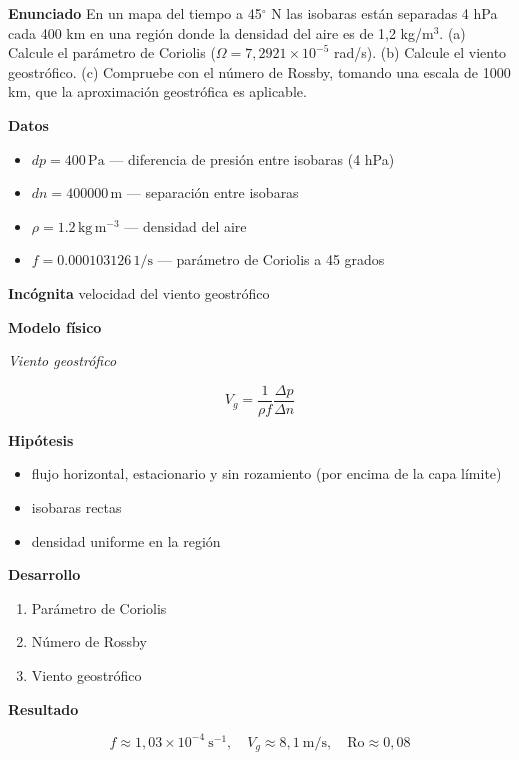\documentclass[10pt,openany]{book}
\begin{document}
\begin{tcolorbox}[title={Problema resuelto}, studiumworked, breakable]

\noindent\textbf{Enunciado}
En un mapa del tiempo a 45\(^\circ\) N las isobaras están separadas 4 hPa cada 400 km en una región donde la densidad del aire es de 1,2 kg/m\(^3\). (a) Calcule el parámetro de Coriolis (\(\Omega = 7{,}2921\times 10^{-5}\) rad/s). (b) Calcule el viento geostrófico. (c) Compruebe con el número de Rossby, tomando una escala de 1000 km, que la aproximación geostrófica es aplicable.

\noindent\textbf{Datos}
\begin{itemize}
\item $dp = 400\,\mathrm{Pa}$ — diferencia de presión entre isobaras (4 hPa)
\item $dn = 400000\,\mathrm{m}$ — separación entre isobaras
\item $\rho = 1.2\,\mathrm{kg}\,\mathrm{m}^{-3}$ — densidad del aire
\item $f = 0.000103126\,\mathrm{1/s}$ — parámetro de Coriolis a 45 grados
\end{itemize}

\noindent\textbf{Incógnita}
velocidad del viento geostrófico

\noindent\textbf{Modelo físico}

\noindent\textit{Viento geostrófico}

\[
V_g = \frac{1}{\rho f}\frac{\Delta p}{\Delta n}
\]

\noindent\textbf{Hipótesis}
\begin{itemize}
\item flujo horizontal, estacionario y sin rozamiento (por encima de la capa límite)
\item isobaras rectas
\item densidad uniforme en la región
\end{itemize}

\noindent\textbf{Desarrollo}
\begin{enumerate}
\item
Parámetro de Coriolis
\item
Número de Rossby
\item
Viento geostrófico
\end{enumerate}

\noindent\textbf{Resultado}

\[
f \approx 1{,}03\times 10^{-4}\ \mathrm{s^{-1}},\quad V_g \approx 8{,}1\ \mathrm{m/s},\quad \mathrm{Ro} \approx 0{,}08
\]


\end{tcolorbox}
\end{document}
